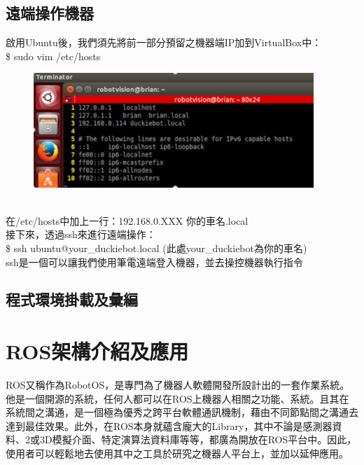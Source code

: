\documentclass{article}
\begin{document}
\subsection{遠端操作機器}
啟用Ubuntu後，我們須先將前一部分預留之機器端IP加到VirtualBox中：
\\\$ sudo vim /etc/hosts
\begin{figure}[htp]
    \begin{center}
        \includegraphics[width=300pt]{pic/圖片16.jpg}
    \end{center}
\end{figure}
\\在/etc/hosts中加上一行：192.168.0.XXX 你的車名.local
\\接下來，透過ssh來進行遠端操作：
\\\$ ssh ubuntu@your\_duckiebot.local     (此處your\_duckiebot為你的車名)
\\ssh是一個可以讓我們使用筆電遠端登入機器，並去操控機器執行指令

\subsection{程式環境掛載及彙編}

\section{ROS架構介紹及應用}
ROS又稱作為RobotOS，是專門為了機器人軟體開發所設計出的一套作業系統。他是一個開源的系統，任何人都可以在ROS上機器人相關之功能、系統。且其在系統間之溝通，是一個極為優秀之跨平台軟體通訊機制，藉由不同節點間之溝通去達到最佳效果。此外，在ROS本身就蘊含龐大的Library，其中不論是感測器資料、2或3D模擬介面、特定演算法資料庫等等，都廣為開放在ROS平台中。因此，使用者可以輕鬆地去使用其中之工具於研究之機器人平台上，並加以延伸應用。
\end{document}
